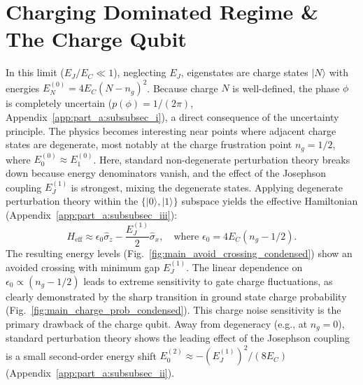 \documentclass[12pt]{article}
\begin{document}
\section{Charging Dominated Regime \& The Charge Qubit}
In this limit ($E_J/E_C \ll 1$), neglecting $E_J$, eigenstates are charge states $|N\rangle$ with energies $E_N^{(0)} = 4E_C(N-n_g)^2$. Because charge $N$ is well-defined, the phase $\phi$ is completely uncertain ($p(\phi)=1/(2\pi)$, Appendix~\ref{app:part_a:subsubsec_i}), a direct consequence of the uncertainty principle. 
The physics becomes interesting near points where adjacent charge states are degenerate, most notably at the charge frustration point $n_g = 1/2$, where $E_0^{(0)} \approx E_1^{(0)}$. Here, standard non-degenerate perturbation theory breaks down because energy denominators vanish, and the effect of the Josephson coupling $E_J^{(1)}$ is strongest, mixing the degenerate states. 
Applying degenerate perturbation theory within the $\{|0\rangle, |1\rangle\}$ subspace yields the effective Hamiltonian (Appendix~\ref{app:part_a:subsubsec_iii}): %
\begin{equation}
 H_{\text{eff}} \approx \epsilon_0 \hat{\sigma}_z - \frac{E_J^{(1)}}{2} \hat{\sigma}_x, \quad \text{where } \epsilon_0 = 4 E_C (n_g - 1/2).
 \label{eq:main_Heff_charge_condensed}
\end{equation}
The resulting energy levels (Fig.~\ref{fig:main_avoid_crossing_condensed}) show an avoided crossing with minimum gap $E_J^{(1)}$. The linear dependence on $\epsilon_0 \propto (n_g-1/2)$ leads to extreme sensitivity to gate charge fluctuations, as clearly demonstrated by the sharp transition in ground state charge probability (Fig.~\ref{fig:main_charge_prob_condensed}). This charge noise sensitivity is the primary drawback of the charge qubit. Away from degeneracy (e.g., at $n_g=0$), standard perturbation theory shows the leading effect of the Josephson coupling is a small second-order energy shift $E_0^{(2)} \approx -(E_J^{(1)})^2/(8E_C)$ (Appendix~\ref{app:part_a:subsubsec_ii}). %
\end{document}
